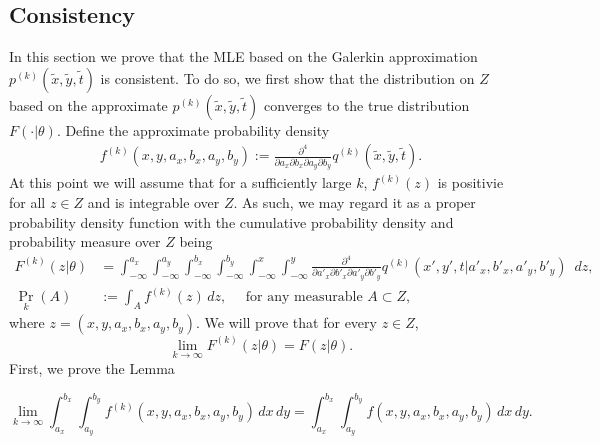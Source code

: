\subsection{Consistency}
In this section we prove that the MLE based on the Galerkin
approximation $p^{(k)}(\tilde{x},\tilde{y},\tilde{t})$ is
consistent. To do so, we first show that the distribution on $Z$ based
on the approximate $p^{(k)}(\tilde{x},\tilde{y},\tilde{t})$ converges
to the true distribution $F(\cdot | \theta)$. Define the approximate probability
density
\begin{align}
  f^{(k)}(x,y,a_x,b_x,a_y,b_y) := \frac{\partial^4}{\partial
  a_x \partial b_x \partial a_y \partial b_y}
  q^{(k)}(\tilde{x},\tilde{y},\tilde{t}). \label{eq:galerkin-density}
\end{align}
At this point we will assume that for a sufficiently large $k$,
$f^{(k)}(z)$ is positivie for all $z \in Z$ and is integrable over
$Z$. As such, we may regard it as a proper probability density
function with the cumulative probability density and probability
measure over $Z$ being
\begin{align}
  F^{(k)}(z | \theta) &= \displaystyle \int_{-\infty}^{a_x} \displaystyle \int_{-\infty}^{a_y} \displaystyle \int_{-\infty}^{b_x} \displaystyle \int_{-\infty}^{b_y} \displaystyle \int_{-\infty}^x \displaystyle \int_{-\infty}^y \frac{\partial^4}{\partial a'_x \partial b'_x \partial a'_y \partial b'_y} q^{(k)}(x', y', t | a'_x, b'_x, a'_y, b'_y)\,\,\, dz, \label{eq:approx-measure} \\
                          \Pr_{k}(A) &:= \displaystyle \int_{A} f^{(k)}(z)\, dz, \quad \mbox{ for any measurable } A \subset Z, \label{eq:approx-measure-2}
\end{align}
where $z = (x,y,a_x,b_x,a_y,b_y)$.  We will prove that for every
$z \in Z$,
\[
  \lim_{k\to \infty} F^{(k)}(z | \theta) = F(z | \theta).
\]
First, we prove the Lemma
\begin{lemma}\label{lem:1}
  \[
    \lim_{k\to \infty} \displaystyle \int_{a_x}^{b_x} \displaystyle
    \int_{a_y}^{b_y} f^{(k)}(x,y,a_x,b_x,a_y,b_y)\, dx\,dy =
    \displaystyle \int_{a_x}^{b_x} \displaystyle \int_{a_y}^{b_y}
    f(x,y,a_x,b_x,a_y,b_y)\, dx\,dy.
  \]
\end{lemma}
